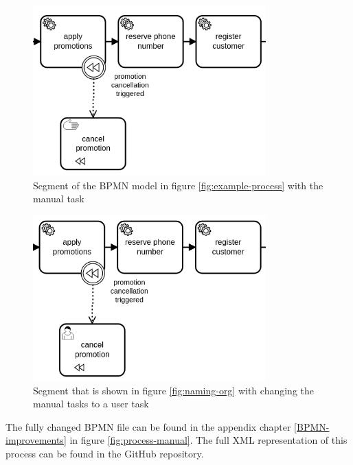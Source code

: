 \begin{minipage}[t]{0.5\textwidth}
	\begin{figure}[H]
		\centering
		\includegraphics[width=0.8\textwidth]{graphics/case-study-manual-org}
		\caption{Segment of the BPMN model in figure \ref{fig:example-process} with the manual task}
		\label{fig:manual-org}
	\end{figure}
\end{minipage}
\begin{minipage}[t]{0.5\textwidth}
	\begin{figure}[H]
		\centering
		\includegraphics[width=0.8\textwidth]{graphics/case-study-manual-new}
		\caption{Segment that is shown in figure \ref{fig:naming-org} with changing the manual tasks to a user task}
		\label{fig:manual-new}
	\end{figure}
\end{minipage}

The fully changed BPMN file can be found in the appendix chapter \ref{BPMN-improvements} in figure \ref{fig:process-manual}. The full XML representation of this process can be found in the GitHub repository\cite{appendix-registration-3}.
